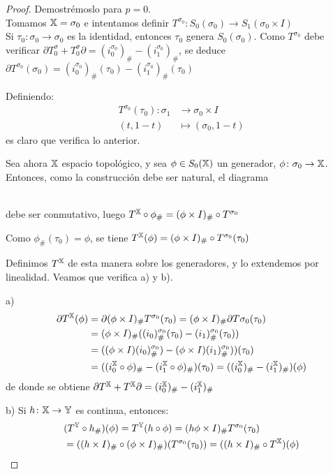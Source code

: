 \begin{proof}
  Demostrémoslo para $p = 0$. \\
  Tomamos ${\mathbb X} = \sigma_0$ e intentamos definir $T^{\sigma_0} \colon S_0(\sigma_0) \to S_1(\sigma_0 \times I)$ \\
  Si $\tau_0 \colon \sigma_0 \to \sigma_0$ es la identidad, entonces $\tau_0$ genera $S_0(\sigma_0)$. Como $T^{\sigma_0}$
  debe verificar $\partial T^\sigma_0 + T^\sigma_0 \partial = (i_0^{\sigma_0})_\# - (i_1^{\sigma_0})_\#$, se deduce
  $\partial T^{\sigma_0}(\sigma_0) = (i_0^{\sigma_0})_\# (\tau_0) - (i_1^{\sigma_0})_\# (\tau_0)$

  Definiendo:
  \begin{align*}
    T^{\sigma_0}(\tau_0) \colon \sigma_1 &\to \sigma_0 \times I \\
                       (t, 1-t) &\mapsto (\sigma_0, 1-t)
  \end{align*}
  es claro que verifica lo anterior.

  Sea ahora ${\mathbb X}$ espacio topológico, y sea $\phi \in S_0({\mathbb X})$ un generador, $\phi \colon \sigma_0 \to {\mathbb X}$.
  Entonces, como la construcción debe ser natural, el diagrama \\
   \\
  debe ser conmutativo, luego $T^{\mathbb X} \circ \phi_\# = (\phi \times I)_\# \circ T^{\sigma_0}$

  Como $\phi_\#(\tau_0) = \phi$, se tiene $T^{\mathbb X}(\phi) = (\phi \times I)_\# \circ T^{\sigma_0}(\tau_0)$

  Definimos $T^{\mathbb X}$ de esta manera sobre los generadores, y lo extendemos por linealidad. Veamos que verifica a) y b).

  a)
  \begin{align*}
    \partial T^{\mathbb X}(\phi) &= \partial(\phi \times I)_\# T^{\sigma_0}(\tau_0) = (\phi \times I)_\# \partial T{ \sigma_0}(\tau_0) \\
                        &= (\phi \times I)_\# ((i_0)_\#^{\sigma_0}(\tau_0) - (i_1)_\#^{\sigma_0}(\tau_0)) \\
                        &= ((\phi \times I) (i_0)_\#^{\sigma_0}) - (\phi \times I) (i_1)_\#^{\sigma_0}))(\tau_0) \\
                        &= ((i_0^{\mathbb X} \circ \phi)_\# - (i_1^{\mathbb X} \circ \phi)_\#) (\tau_0) = ((i_0^{\mathbb X})_\# - (i_1^{\mathbb X})_\#)(\phi)
  \end{align*}
  de donde se obtiene $\partial T^{\mathbb X} + T^{\mathbb X} \partial = (i_0^{\mathbb X})_\# - (i_1^{\mathbb X})_\#$

  b) Si $h \colon {\mathbb X} \to {\mathbb Y}$ es continua, entonces:
  \begin{align*}
    &(T^{\mathbb Y} \circ h_\#)(\phi) = T^{\mathbb Y}(h \circ \phi) = (h\phi \times I)_\# T^{\sigma_0}(\tau_0) \\
    &= ((h \times I)_\# \circ (\phi \times I)_\#) (T^{\sigma_0}(\tau_0)) = ((h \times I)_\# \circ T^{\mathbb X})(\phi)
  \end{align*}



\end{proof}
